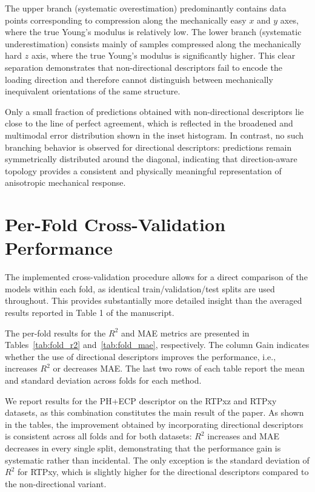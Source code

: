 The upper branch (systematic overestimation) predominantly contains data points corresponding to compression along the mechanically easy $x$ and $y$ axes, where the true Young’s modulus is relatively low. The lower branch (systematic underestimation) consists mainly of samples compressed along the mechanically hard $z$ axis, where the true Young’s modulus is significantly higher. This clear separation demonstrates that non-directional descriptors fail to encode the loading direction and therefore cannot distinguish between mechanically inequivalent orientations of the same structure.

Only a small fraction of predictions obtained with non-directional descriptors lie close to the line of perfect agreement, which is reflected in the broadened and multimodal error distribution shown in the inset histogram. In contrast, no such branching behavior is observed for directional descriptors: predictions remain symmetrically distributed around the diagonal, indicating that direction-aware topology provides a consistent and physically meaningful representation of anisotropic mechanical response.

\section{Per-Fold Cross-Validation Performance}
The implemented cross-validation procedure allows for a direct comparison of the models within each fold, as identical train/validation/test splits are used throughout. This provides substantially more detailed insight than the averaged results reported in Table 1 of the manuscript.

The per-fold results for the $R^2$ and MAE metrics are presented in Tables~\ref{tab:fold_r2} and~\ref{tab:fold_mae}, respectively. The column Gain indicates whether the use of directional descriptors improves the performance, i.e., increases $R^2$ or decreases MAE. The last two rows of each table report the mean and standard deviation across folds for each method.

We report results for the PH+ECP descriptor on the RTPxz and RTPxy datasets, as this combination constitutes the main result of the paper. As shown in the tables, the improvement obtained by incorporating directional descriptors is consistent across all folds and for both datasets: $R^2$ increases and MAE decreases in every single split, demonstrating that the performance gain is systematic rather than incidental. The only exception is the standard deviation of $R^2$ for RTPxy, which is slightly higher for the directional descriptors compared to the non-directional variant.

